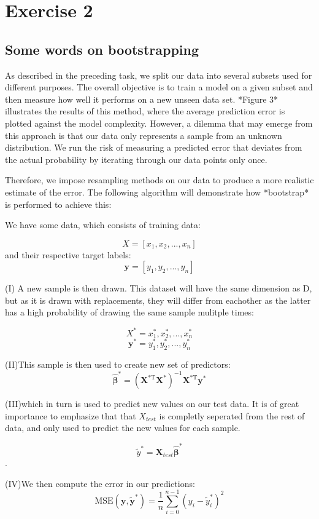 \documentclass[11pt, a4paper]{article}
\begin{document}
\section*{\label{ex:2}Exercise 2}
\subsection*{Some words on bootstrapping}
As described in the preceding task, we split our data into several subsets used for different purposes. The overall objective is to train a model on a given subset and then measure how well it performs on a new unseen data set. *Figure 3* illustrates the results of this method, where the average prediction error is plotted against the model complexity. However, a dilemma that may emerge from this approach is that our data only represents a sample from an unknown distribution. We run the risk of measuring a predicted error that deviates from the actual probability by iterating through our data points only once.

Therefore, we impose resampling methods on our data to produce a more realistic estimate of the error. The following algorithm will demonstrate how *bootstrap* is performed to achieve this\cite{ref_forelesning}:

We have some data, which consists of training data:

$$X = [x_1,x_2,...,x_n]$$
and their respective target labels:
$$\bm{y} = [y_1,y_2,...,y_n]$$


(I) A new sample is then drawn. This dataset will have the same dimension as D, but as it is drawn with replacements, they will differ from eachother as the latter has a high probability of drawing the same sample mulitple times:

$$X^* = x_{1}^{*}, x_{2}^{*}, ... ,x_{n}^{*}$$
$$\bm{y}^*= y_{1}^{*}, y_{2}^{*}, ... ,y_{n}^{*}$$

(II)This sample is then used to create new set of predictors:
\[
  \bm{\hat{\beta}}^* = \left(\bm{X}^\text{*T}\bm{X}^*\right)^{-1}\bm{X}^\text{*T}\bm{y}^*
\]

(III)which in turn is used to predict new values on our test data. It is of great importance to emphasize that that $X_{test}$ is completly seperated from the rest of data, and only used to predict the new values for each sample.


$$\tilde{y}^* = \bm{X}_{test}\bm{\hat{\beta}^*}$$.

(IV)We then compute the error in our predictions:
\[
  \text{MSE}(\boldsymbol{y},\boldsymbol{\tilde{y}^*}) = \frac{1}{n}
  \sum_{i=0}^{n-1}(y_i-\tilde{y}^{*}_i)^2
\]
\end{document}

